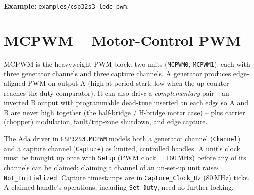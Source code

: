 \noindent\textbf{Example:} \texttt{examples/esp32s3\_ledc\_pwm}.

\section{MCPWM -- Motor-Control PWM}
\label{app:int:mcpwm}

MCPWM is the heavyweight PWM block: two units (\texttt{MCPWM0}, \texttt{MCPWM1}),
each with three generator channels and three capture channels. A generator
produces edge-aligned PWM on output A (high at period start, low when the
up-counter reaches the duty comparator). It can also drive a \emph{complementary}
pair -- an inverted B output with programmable dead-time inserted on each edge so
A and B are never high together (the half-bridge / H-bridge motor case) -- plus
carrier (chopper) modulation, fault/trip-zone shutdown, and edge capture.

The Ada driver in \texttt{ESP32S3.MCPWM} models both a generator channel
(\texttt{Channel}) and a capture channel (\texttt{Capture}) as limited, controlled
handles. A unit's clock must be brought up once with \texttt{Setup} (PWM clock =
160\,MHz) before any of its channels can be claimed; claiming a channel of an
un-set-up unit raises \texttt{Not\_Initialized}. Capture timestamps are in
\texttt{Capture\_Clock\_Hz} (80\,MHz) ticks. A claimed handle's operations,
including \texttt{Set\_Duty}, need no further locking.


